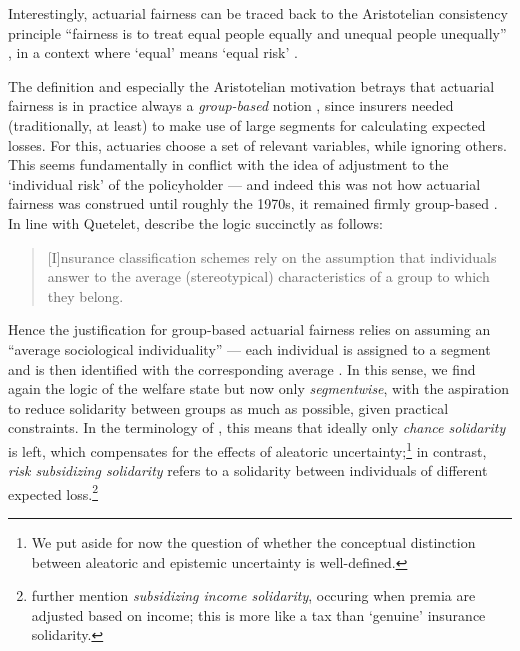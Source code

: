 \documentclass[11pt]{article} %
\makeatletter
\newcommand*{\eg}{e.g.\@\xspace}
\makeatother
\begin{document}
Interestingly, actuarial fairness can be traced back to the Aristotelian consistency principle ``fairness is to treat equal people equally and unequal people unequally'' \citep{landes2015fair}, in a context where `equal' means `equal risk' \citep{martinez2016fair}. 


The definition and especially the Aristotelian motivation betrays that actuarial fairness is in practice always a \textit{group-based} notion \citep{miller2009disparate}, since insurers needed (traditionally, at least) to make use of large segments for calculating expected losses. For this, actuaries choose a set of relevant variables, while ignoring others. This seems fundamentally in conflict with the idea of adjustment to the `individual risk' of the policyholder --- and indeed this was not how actuarial fairness was construed until roughly the 1970s, it remained firmly group-based \citep{barry2020insurance}.
In line with Quetelet, \citet{thiery2006fairness} describe the logic succinctly as follows:
\begin{quote}
    [I]nsurance classification schemes rely on the assumption that individuals answer to the average
(stereotypical) characteristics of a group to which they belong. 
\end{quote}

Hence the justification for group-based actuarial fairness relies on assuming an ``average sociological individuality'' \citep{dean1998risk} --- each individual is assigned to a segment and is then identified with the corresponding average \citep{krippner2022person}. In this sense, we find again the logic of the welfare state but now only \textit{segmentwise}, with the aspiration to reduce solidarity between groups as much as possible, given practical constraints.
In the terminology of \citet{lehtonen2011forms}, this means that ideally only \textit{chance solidarity} is left, which compensates for the effects of aleatoric uncertainty;\footnote{We put aside for now the question of whether the conceptual distinction between aleatoric and epistemic uncertainty is well-defined.} in contrast, \textit{risk subsidizing solidarity} refers to a solidarity between individuals of different expected loss.\footnote{\citet{lehtonen2011forms} further mention \textit{subsidizing income solidarity}, occuring when premia are adjusted based on income; this is more like a tax than `genuine' insurance solidarity.}
\end{document}
